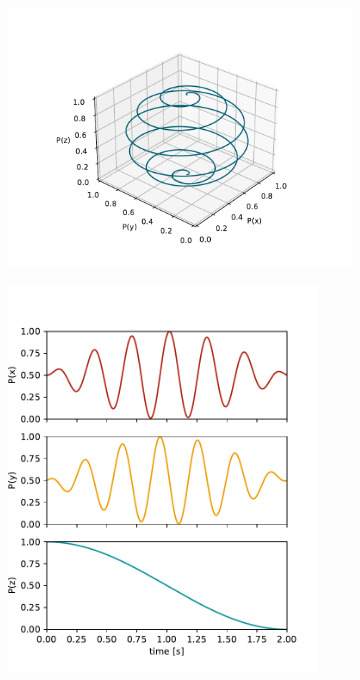 \begin{figure}
\centering
\begin{subfigure}{.55\textwidth} 
  \centering
  \includegraphics[width=\textwidth]{figures/rabi_pi.pdf}
\end{subfigure}%
\begin{subfigure}{.45\textwidth}
  \centering
  \includegraphics[width=0.9\textwidth]{figures/rabi_pi_px_py_pz.pdf}

\end{subfigure}
\end{figure}
